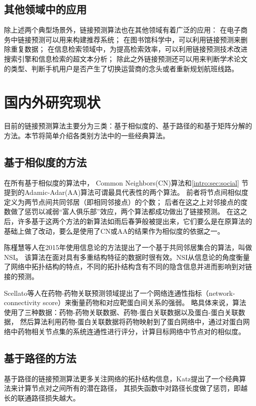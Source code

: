 \subsection{其他领域中的应用}
除上述两个典型场景外，链接预测算法也在其他领域有着广泛的应用：
在电子商务中链接预测可以用来构建推荐系统；
在图书馆科学中，可以利用链接预测来删除重复数据；
在信息检索领域中，为提高检索效率，可以利用链接预测技术改进搜索引擎和信息检索的超文本分析\cite{李淑玲2012基于相似性的链接预测方法研究}；
除此之外链接预测还可以用来判断学术论文的类型、判断手机用户是否产生了切换运营商的念头\cite{李淑玲2012基于相似性的链接预测方法研究}或者重新规划航班线路。


\section{国内外研究现状}
\label{intro:sec:study}
目前的链接预测算法主要分为三类：基于相似度的、基于路径的和基于矩阵分解的方法\cite{lu2009similarity}。本节将简单介绍各类别方法中的一些经典算法。

\subsection{基于相似度的方法}
在所有基于相似度的算法中，
Common Neighbors(CN)算法和\ref{intro:sec:social} 节提到的Adamic-Adar(AA)算法可谓最具代表性的两个算法。
前者将节点间相似度定义为两节点间共同邻居（即相同邻接点）的个数；
后者在这之上对邻接点的度数做了惩罚以减弱“富人俱乐部”效应，两个算法都成功做出了链接预测。
在这之后，许多基于这两个方法的新算法如雨后春笋般被提出来，它们要么是在原算法的基础上做了改动，要么是使用了CN或AA的结果作为相似度的依据之一。

陈槿慧等人在2015年使用信息论的方法提出了一个基于共同邻居集合的算法，叫做NSI。
该算法在面对具有多重结构特征的数据时很有效。NSI从信息论的角度衡量了网络中拓扑结构的特点，不同的拓扑结构含有不同的隐含信息并进而影响到对链接的预测\cite{chen2014robust}。

Scellato等人在药物-药物关联预测领域提出了一个网络连通性指标（network-connectivity score）来衡量药物和对应靶蛋白间关系的强弱。
略具体来说，算法使用了三种数据：药物-药物关联数据、药物-蛋白关联数据以及蛋白-蛋白关联数据，
然后算法利用药物-蛋白关联数据将药物映射到了蛋白网络中，通过对蛋白网络中药物相关节点集的系统连通性进行评分，计算目标网络中节点对的相似度\cite{scellato2011exploiting}。


\subsection{基于路径的方法}
基于路径的链接预测算法更多关注网络的拓扑结构信息，Katz提出了一个经典算法来计算节点对之间所有的潜在路径，
其损失函数中对路径长度做了惩罚，即越长的联通路径损失越大\cite{elhamifar2013sparse}。

